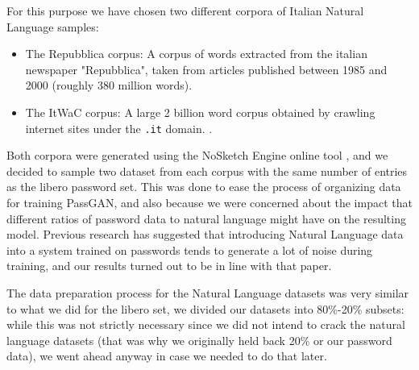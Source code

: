 For this purpose we have chosen two different corpora of Italian Natural Language samples: 
\begin{itemize}
    \item The Repubblica corpus: A corpus of words extracted from the italian newspaper "Repubblica", taken from articles published between 1985 and 2000 (roughly 380 million words).\cite{repubblica_corpus}
    \item The ItWaC corpus: A large 2 billion word corpus obtained by crawling internet sites under the \texttt{.it} domain. \cite{itwac_corpus}.  
\end{itemize}
Both corpora were generated using the NoSketch Engine online tool \cite{nosketch_engine}, and we decided to sample two dataset from each corpus with the same number of entries as the libero password set. This was done to ease the process of organizing data for training PassGAN, and also because we were concerned about the impact that different ratios of password data to natural language might have on the resulting model.
Previous research \cite{Melicher2016} has suggested that introducing Natural Language data into a system trained on passwords tends to generate a lot of noise during training, and our results turned out to be in line with that paper.

The data preparation process for the Natural Language datasets was very similar to what we did for the libero set, we divided our datasets into 80\%-20\% subsets: while this was not strictly necessary since we did not intend to crack the natural language datasets (that was why we originally held back 20\% or our password data), we went ahead anyway in case we needed to do that later. 


